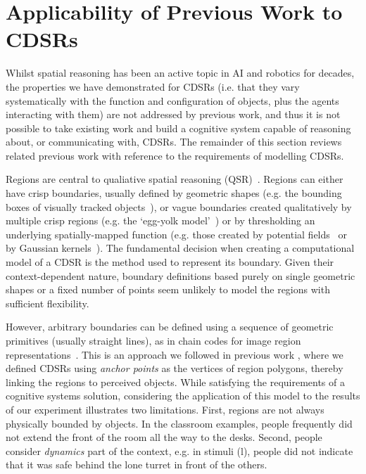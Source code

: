 \documentclass[11pt,letterpaper]{article}
\begin{document}
\section{Applicability of Previous Work to CDSRs}

Whilst spatial reasoning has been an active topic in AI and robotics for decades, the properties we have demonstrated for CDSRs (i.e. that they vary systematically with the function and configuration of objects, plus the agents interacting with them) are not addressed by previous work, and thus it is not possible to take existing work and build a cognitive system capable of reasoning about, or communicating with, CDSRs. The remainder of this section reviews related previous work with reference to the requirements of modelling CDSRs.
 
Regions are central to qualiative spatial reasoning (QSR)~\cite{Cohn:2001}. Regions can either have crisp boundaries, usually defined by geometric shapes (e.g. the bounding boxes of visually tracked objects~\cite{SridharCohn:10}), or vague boundaries created qualitatively by multiple crisp regions (e.g. the `egg-yolk model'~\cite{Cohn96b}) or by thresholding an underlying spatially-mapped function (e.g. those created by potential fields~\cite{brenneretal07ijcai} or by Gaussian kernels~\cite{burbridge-dearden12}). The fundamental decision when creating a computational model of a CDSR is the method used to represent its boundary. Given their context-dependent nature, boundary definitions based purely on single geometric shapes or a fixed number of points seem unlikely to model the regions with sufficient flexibility.

However, arbitrary boundaries can be defined using a sequence of geometric primitives (usually straight lines), as in chain codes for image region representations~\cite{Freeman:1961}. This is an approach we followed in previous work \cite{Hawes:2012}, where we defined CDSRs using \textit{anchor points} \cite{DBLP:journals/jetai/KlenkFTK11} as the vertices of region polygons, thereby linking the regions to perceived objects.  While satisfying the requirements of a cognitive systems solution, considering the application of this model to the  results of our experiment illustrates two limitations.  First, regions are not always physically bounded by objects.  In the classroom examples, people frequently did not extend the front of the room all the way to the desks.  Second, people consider \emph{dynamics} part of the context, e.g. in stimuli (l), people did not indicate that it was safe behind the lone turret in front of the others.
\end{document}
